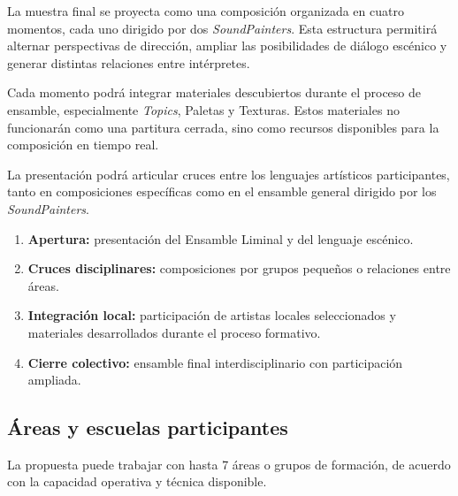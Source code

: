 \documentclass[11pt,a4paper]{article}
\begin{document}
La muestra final se proyecta como una composición organizada en cuatro momentos, cada uno dirigido por dos \textit{SoundPainters}. Esta estructura permitirá alternar perspectivas de dirección, ampliar las posibilidades de diálogo escénico y generar distintas relaciones entre intérpretes.

Cada momento podrá integrar materiales descubiertos durante el proceso de ensamble, especialmente \textit{Topics}, Paletas y Texturas. Estos materiales no funcionarán como una partitura cerrada, sino como recursos disponibles para la composición en tiempo real.

La presentación podrá articular cruces entre los lenguajes artísticos participantes, tanto en composiciones específicas como en el ensamble general dirigido por los \textit{SoundPainters}.

\begin{enumerate}
  \item \textbf{Apertura:} presentación del Ensamble Liminal y del lenguaje escénico.
  \item \textbf{Cruces disciplinares:} composiciones por grupos pequeños o relaciones entre áreas.
  \item \textbf{Integración local:} participación de artistas locales seleccionados y materiales desarrollados durante el proceso formativo.
  \item \textbf{Cierre colectivo:} ensamble final interdisciplinario con participación ampliada.
\end{enumerate}

\subsection{Áreas y escuelas participantes}

La propuesta puede trabajar con hasta 7 áreas o grupos de formación, de acuerdo con la capacidad operativa y técnica disponible.
\end{document}
